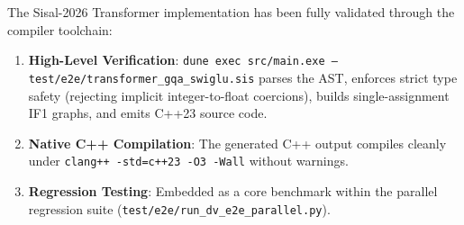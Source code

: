 The Sisal-2026 Transformer implementation has been fully validated through the compiler toolchain:
\begin{enumerate}
  \item \textbf{High-Level Verification}: \texttt{dune exec src/main.exe -- test/e2e/transformer\_gqa\_swiglu.sis} parses the AST, enforces strict type safety (rejecting implicit integer-to-float coercions), builds single-assignment IF1 graphs, and emits C++23 source code.
  \item \textbf{Native C++ Compilation}: The generated C++ output compiles cleanly under \texttt{clang++ -std=c++23 -O3 -Wall} without warnings.
  \item \textbf{Regression Testing}: Embedded as a core benchmark within the parallel regression suite (\texttt{test/e2e/run\_dv\_e2e\_parallel.py}).
\end{enumerate}
